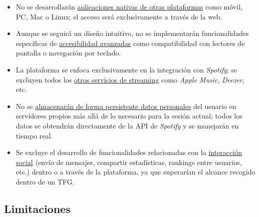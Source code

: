 \begin{itemize}
    \item No se desarrollarán \underline{aplicaciones nativas de otras plataformas} como móvil, PC, Mac o Linux; el acceso será exclusivamente a través de la web.

    \item Aunque se seguirá un diseño intuitivo, no se implementarán funcionalidades específicas de \underline{accesibilidad avanzadas} como compatibilidad con lectores de pantalla o navegación por teclado.

    \item La plataforma se enfoca exclusivamente en la integración con \textit{Spotify}; se excluyen todos los \underline{otros servicios de streaming} como \textit{Apple Music}, \textit{Deezer}, etc.

    \item No se \underline{almacenarán de forma persistente datos personales} del usuario en servidores propios más allá de lo necesario para la sesión actual; todos los datos se obtendrán directamente de la API de \textit{Spotify} y se manejarán en tiempo real.

    \item Se excluye el desarrollo de funcionalidades relacionadas con la \underline{interacción social} (envío de mensajes, compartir estadísticas, rankings entre usuarios, etc.) dentro o a través de la plataforma, ya que superarían el alcance recogido dentro de un TFG.





\end{itemize}

\subsection{Limitaciones}

